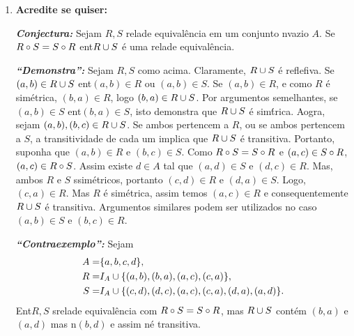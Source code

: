 \begin{enumerate}[{\bf 1.}]
\noindent \textit{\textbf{Conjectura:}} Seja $R$ uma rela\cao em um conjunto n\ao vazio $A$. Se $R$ \'e transitiva ent\ao $R\bola R$ \'e transitiva.

\noindent \textit{\textbf{``Demonstra\caoi'':}} Seja $R$ uma rela\cao transitiva em $A$. Sejam $a,b,c\in A$ com $(a,b),(b,c)\in R\bola R$. Ent\ao existem $d,e\in A$ tais que $(a,d),(d,b),(b,e),(e,c)\in R$. Como $R$ \'e transitiva $(a,b),(b,c)\in R$, isso implica que $(a,c)\in R\bola R$, logo $R\bola R$ \'e transitiva.

\noindent \textit{\textbf{``Contraexemplo'':}} Seja, $A=\{1,2,3\}$ $R=\{(1,2),(2,2),(2,3),(1,3)\}$. Assim,
\[
R\bola R=\{(1,3),(1,2),(2,3),(2,2)\},
\]
logo temos $R$ transitiva e $R\bola R$ n\aoi.

\item {\bf Acredite se quiser:}  

\noindent \textit{\textbf{Conjectura:}} Sejam $R,S$ rela\coes de equival\^encia em um conjunto n\ao vazio $A$. Se $R\circ S=S\circ R$ ent\ao $R\cup S$ \'e uma rela\cao de equival\^encia.

\noindent \textit{\textbf{``Demonstra\caoi'':}} Sejam $R,S$ como acima. Claramente, $R\cup S$ \'e reflefiva. Se $(a,b)\in R\cup S$ ent\ao $(a,b)\in R$ ou $(a,b)\in S$. Se $(a,b)\in R$, e como $R$ \'e sim\'etrica, $(b,a)\in R$, logo $(b,a)\in R\cup S$. Por argumentos semelhantes, se $(a,b)\in S$ ent\ao $(b,a)\in S$, isto demonstra que $R\cup S$ \'e sim\'trica. Aogra, sejam $(a,b),(b,c)\in R\cup S$. Se ambos pertencem a $R$, ou se ambos pertencem a $S$, a transitividade de cada um implica que $R\cup S$ \'e transitiva. Portanto, suponha que $(a,b)\in R$ e $(b,c)\in S$. Como $R\circ S=S\circ R$ e $(a,c)\in S\circ R$, $(a,c)\in R\circ S$. Assim existe $d\in A$ tal que $(a,d)\in S$ e $(d,c)\in R$. Mas, ambos $R$ e $S$ s\ao sim\'etricos, portanto $(c,d)\in R$ e $(d,a)\in S$. Logo, $(c,a)\in R$. Mas $R$ \'e sim\'etrica, assim temos $(a,c)\in R$ e consequentemente $R\cup S$ \'e transitiva. Argumentos similares podem ser utilizados no caso $(a,b)\in S$ e $(b,c)\in R$.

\noindent \textit{\textbf{``Contraexemplo'':}} Sejam 
\begin{equation*}
 \begin{aligned}
A=&\{a,b,c,d\},\\
R=&I_A\cup\{(a,b),(b,a),(a,c),(c,a)\},\\
S=&I_A\cup\{(c,d),(d,c),(a,c),(c,a),(d,a),(a,d)\}.
 \end{aligned}
\end{equation*}
Ent\ao $R,S$ s\ao rela\coes de equival\^encia com $R\circ S=S\circ R$, mas $R\cup S$ cont\'em $(b,a)$ e $(a,d)$ mas n\ao $(b,d)$ e assim n\ao \'e transitiva.


\end{enumerate}
